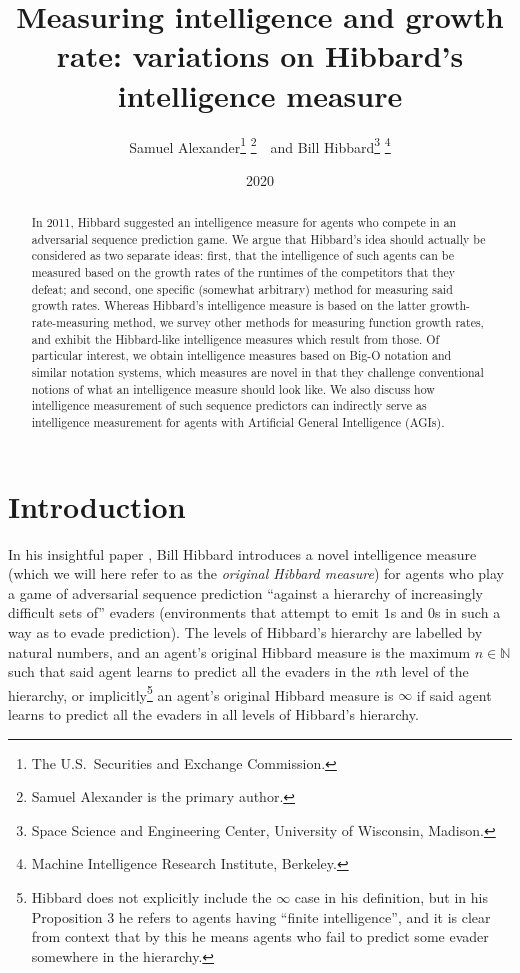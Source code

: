 \documentclass{article}
\title{Measuring intelligence and growth rate: variations on
Hibbard's intelligence measure}
\author{Samuel Alexander\thanks{The U.S.\ Securities and Exchange Commission.}
\thanks{Samuel Alexander is the primary author.}\ \ and Bill Hibbard\thanks{Space Science
and Engineering Center, University of Wisconsin, Madison.}
\thanks{Machine Intelligence Research Institute, Berkeley.}}
\date{2020}
\begin{document}
\maketitle

\begin{abstract}
    In 2011, Hibbard suggested an intelligence measure for agents
    who compete in an adversarial sequence prediction game. We argue
    that Hibbard's idea should actually be considered as two separate
    ideas: first, that the intelligence of such agents can be measured
    based on the growth rates of the runtimes of the competitors that
    they defeat; and second, one specific (somewhat arbitrary) method for measuring said
    growth rates. Whereas Hibbard's intelligence measure is based on the latter
    growth-rate-measuring method, we survey
    other methods for measuring function
    growth rates, and exhibit the Hibbard-like intelligence measures
    which result from those. Of particular interest, we obtain intelligence measures
    based on Big-O notation and similar notation systems, which measures
    are novel in that they challenge conventional notions of what an
    intelligence measure should look like. We also discuss how intelligence measurement
    of such sequence predictors can indirectly serve as intelligence measurement for
    agents with Artificial General Intelligence (AGIs).
\end{abstract}

\section{Introduction}

In his insightful paper \cite{hibbard}, Bill Hibbard introduces a novel
intelligence measure (which we will here refer to as the \emph{original Hibbard measure})
for agents who play a game of adversarial sequence prediction
\cite{hibbard2008adversarial}
``against a hierarchy of increasingly difficult sets of'' evaders (environments that attempt
to emit $1$s and $0$s in such a way as to evade prediction).
The levels of Hibbard's hierarchy are labelled by natural numbers, and
an agent's original Hibbard measure is the maximum $n\in\mathbb N$ such that
said agent learns to predict all the evaders in the $n$th level of the hierarchy,
or implicitly\footnote{Hibbard does not explicitly include the $\infty$ case in his
definition, but in his Proposition 3 he refers to agents having ``finite intelligence'', and
it is clear from context that by this he means agents who fail to predict some evader
somewhere in the hierarchy.} an agent's original Hibbard measure is $\infty$
if said agent learns to predict all the evaders in all levels of Hibbard's hierarchy.
\end{document}
